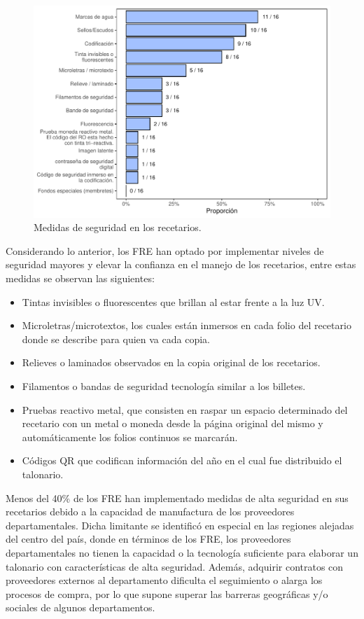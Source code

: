 \documentclass[
  oneside]{book}
\begin{document}
\begin{figure}

{\centering \includegraphics[width=0.9\linewidth]{InformeFinal_files/figure-latex/MedidasSeguridadRec-1} 

}

\caption{Medidas de seguridad en los recetarios.}\label{fig:MedidasSeguridadRec}
\end{figure}

Considerando lo anterior, los FRE han optado por implementar niveles de seguridad mayores y elevar la confianza en el manejo de los recetarios, entre estas medidas se observan las siguientes:

\begin{itemize}
\item
  Tintas invisibles o fluorescentes que brillan al estar frente a la luz UV.
\item
  Microletras/microtextos, los cuales están inmersos en cada folio del recetario donde se describe para quien va cada copia.
\item
  Relieves o laminados observados en la copia original de los recetarios.
\item
  Filamentos o bandas de seguridad tecnología similar a los billetes.
\item
  Pruebas reactivo metal, que consisten en raspar un espacio determinado del recetario con un metal o moneda desde la página original del mismo y automáticamente los folios continuos se marcarán.
\item
  Códigos QR que codifican información del año en el cual fue distribuido el talonario.
\end{itemize}

Menos del 40\% de los FRE han implementado medidas de alta seguridad en sus recetarios debido a la capacidad de manufactura de los proveedores departamentales. Dicha limitante se identificó en especial en las regiones alejadas del centro del país, donde en términos de los FRE, los proveedores departamentales no tienen la capacidad o la tecnología suficiente para elaborar un talonario con características de alta seguridad. Además, adquirir contratos con proveedores externos al departamento dificulta el seguimiento o alarga los procesos de compra, por lo que supone superar las barreras geográficas y/o sociales de algunos departamentos.
\end{document}
